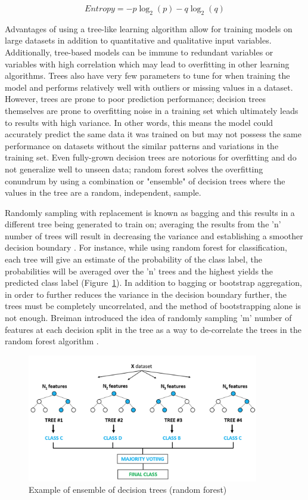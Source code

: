 \documentclass{llncs}
\begin{document}
\begin{equation}
Entropy = -p\log_{2}(p) - q\log_{2}(q)
\end{equation}

Advantages of using a tree-like learning algorithm allow for training models on large datasets in addition to quantitative and qualitative input variables. Additionally, tree-based models can be immune to redundant variables or variables with high correlation which may lead to overfitting in other learning algorithms. Trees also have very few parameters to tune for when training the model and performs relatively well with outliers or missing values in a dataset. However, trees are prone to poor prediction performance; decision trees themselves are prone to overfitting noise in a training set which ultimately leads to results with high variance. In other words, this means the model could accurately predict the same data it was trained on but may not possess the same performance on datasets without the similar patterns and variations in the training set. Even fully-grown decision trees are notorious for overfitting and do not generalize well to unseen data; random forest solves the overfitting conundrum by using a combination or "ensemble" of decision trees where the values in the tree are a random, independent, sample. 

Randomly sampling with replacement is known as bagging and this results in a different tree being generated to train on; averaging the results from the 'n' number of trees will result in decreasing the variance and establishing a smoother decision boundary \cite{hastie}. For instance, while using random forest for classification, each tree will give an estimate of the probability of the class label, the probabilities will be averaged over the 'n' trees and the highest yields the predicted class label (Figure~\ref{fig:rftree}). In addition to bagging or bootstrap aggregation, in order to further reduces the variance in the decision boundary further, the trees must be completely uncorrelated, and the method of bootstrapping alone is not enough. Breiman introduced the idea of randomly sampling 'm' number of features at each decision split in the tree as a way to de-correlate the trees in the random forest algorithm \cite{breiman}.  

\begin{figure}
\centering
\includegraphics[width=0.90\textwidth]{randomforest.png}
\caption{Example of ensemble of decision trees (random forest)}
\label{fig:rftree}
\end{figure}
\end{document}
